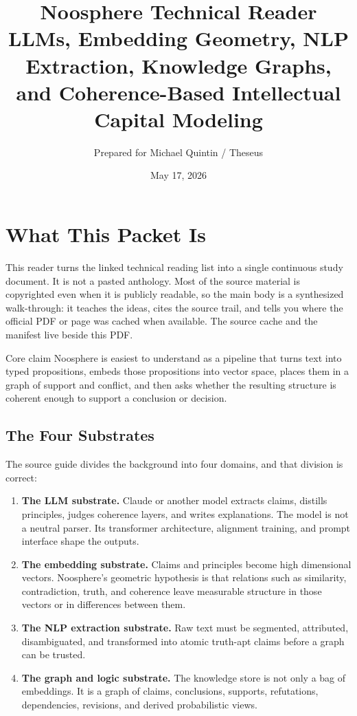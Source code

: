 \documentclass[11pt]{article}
\title{\textbf{Noosphere Technical Reader}\\\large LLMs, Embedding Geometry, NLP Extraction, Knowledge Graphs, and Coherence-Based Intellectual Capital Modeling}
\author{Prepared for Michael Quintin / Theseus}
\date{May 17, 2026}
\begin{document}
\maketitle
\tableofcontents
\newpage

\section{What This Packet Is}

This reader turns the linked technical reading list into a single continuous
study document. It is not a pasted anthology. Most of the source material is
copyrighted even when it is publicly readable, so the main body is a synthesized
walk-through: it teaches the ideas, cites the source trail, and tells you where
the official PDF or page was cached when available. The source cache and the
manifest live beside this PDF.

\begin{readerbox}{Core claim}
Noosphere is easiest to understand as a pipeline that turns text into typed
propositions, embeds those propositions into vector space, places them in a
graph of support and conflict, and then asks whether the resulting structure is
coherent enough to support a conclusion or decision.
\end{readerbox}

\subsection{The Four Substrates}

The source guide divides the background into four domains, and that division is
correct:

\begin{enumerate}
\item \textbf{The LLM substrate.} Claude or another model extracts claims,
distills principles, judges coherence layers, and writes explanations. The model
is not a neutral parser. Its transformer architecture, alignment training, and
prompt interface shape the outputs.
\item \textbf{The embedding substrate.} Claims and principles become high
dimensional vectors. Noosphere's geometric hypothesis is that relations such as
similarity, contradiction, truth, and coherence leave measurable structure in
those vectors or in differences between them.
\item \textbf{The NLP extraction substrate.} Raw text must be segmented,
attributed, disambiguated, and transformed into atomic truth-apt claims before a
graph can be trusted.
\item \textbf{The graph and logic substrate.} The knowledge store is not only a
bag of embeddings. It is a graph of claims, conclusions, supports, refutations,
dependencies, revisions, and derived probabilistic views.
\end{enumerate}
\end{document}
